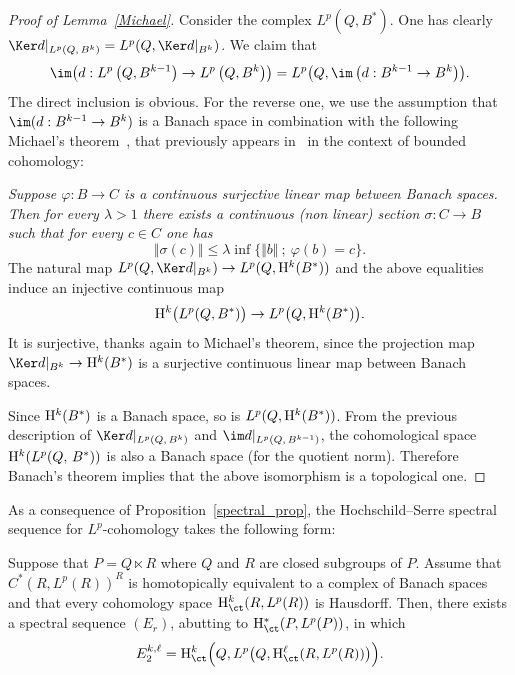 \begin{proof}[Proof of Lemma~\ref{Michael}]
Consider the complex $L^p(Q,B^*)$.
One has clearly\linebreak $\Ker d \vert_{L^p (Q,\,B^k)} = L^p (Q, \Ker d \vert _{B^k})$. We claim that
\[
\im \bigl(d: L^p \left(Q, B^{k-1}\right) \to L^p\left(Q, B^k\right)\bigr) = L^p \bigl(Q, \im \left(d: B^{k-1} \to B^k\right)\bigr).
\]
The direct inclusion is obvious. For the reverse one, we use the assumption that $\im (d: B^{k-1} \to B^k)$ is a Banach space in combination with the following Michael's theorem~\cite[Proposition~7.2]{Mi}, that previously appears in~\cite[p.~93]{Monod_LNM} in the context of bounded cohomology:

\emph{Suppose $\varphi: B \to C$ is a continuous surjective linear map between Banach spaces. Then for every $\lambda >1$ there exists a continuous (non linear) section $\sigma: C \to B$ such that for every $c \in C$ one has
\[
\Vert \sigma (c) \Vert \leqslant \lambda \inf \{\Vert b \Vert~;~\varphi (b) = c\}.
\]
}
The natural map $L^p (Q, \Ker d \vert _{B^k}) \to L^p (Q, {\rm H}^k (B^*))$ and the above equalities induce an injective continuous map
\[
{\rm H}^k \bigl(L^p(Q, B^*)\bigr) \to L^p \bigl(Q, {\rm H}^k (B^*)\bigr).
\]
It is surjective, thanks again to Michael's theorem, since the projection map\linebreak$\Ker d \vert _{B^k}\to {\rm H}^k (B^*)$ is a surjective continuous linear map between Banach spaces.


Since ${\rm H}^k (B^*)$ is a Banach space, so is $L^p (Q, {\rm H}^k (B^*))$. From the previous description of $\Ker d \vert_{ L^p (Q,\,B^k)}$ and $\im d \vert _{ L^p (Q,\, B^{k-1})}$, the cohomological space ${\rm H}^k (L^p(Q,\,B^*))$ is also a Banach space (for the quotient norm). Therefore Banach's theorem implies that the above isomorphism is a topological one.
\end{proof}

As a consequence of Proposition~\ref{spectral_prop}, the Hochschild--Serre spectral sequence for $L^p$-cohomology takes the following form:

\begin{coro}\label{spectral_cor1}
Suppose that $P = Q \ltimes R$ where $Q$ and $R$ are closed subgroups of $P$. Assume that $C^*(R, L^p(R))^R$ is homotopically equivalent to a complex of Banach spaces and that every cohomology space ${\rm H}_{\ct}^k (R, L^p(R))$ is Hausdorff. Then, there exists a spectral sequence $(E_r)$, abutting to ${\rm H}_{\ct} ^*(P, L^p(P))$, in which
\[
E_2 ^{k,\ell} = {\rm H}_{\ct} ^k\Bigl(Q, L^p\bigl(Q, {\rm H}_{\ct} ^\ell (R, L^p(R))\bigr)\Bigr).
\]
\end{coro}

